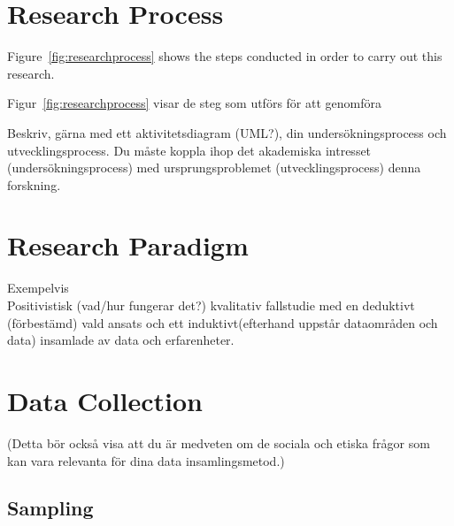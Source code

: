 \section{Research Process}
\label{sec:researchProcess}
Figure~\ref{fig:researchprocess} shows the steps conducted in order to carry out this research.
\begin{swedishnotes}
	Figur~\ref{fig:researchprocess} visar de steg som utförs för att genomföra

	Beskriv, gärna med ett aktivitetsdiagram (UML?), din undersökningsprocess och utvecklingsprocess.  Du måste koppla ihop det akademiska intresset (undersökningsprocess) med ursprungsproblemet (utvecklingsprocess)
	denna forskning.
\end{swedishnotes}



\section{Research Paradigm}
\label{sec:researchParadigm}
\begin{swedishnotes}
	Exempelvis\\
	Positivistisk (vad/hur fungerar det?) kvalitativ fallstudie med en deduktivt (förbestämd) vald ansats och ett induktivt(efterhand uppstår dataområden och data) insamlade av data och erfarenheter.
\end{swedishnotes}

\section{Data Collection}
\label{sec:dataCollection}
\begin{swedishnotes}
	(Detta bör också visa att du är medveten om de sociala och etiska frågor som
	kan vara relevanta för dina data insamlingsmetod.)
\end{swedishnotes}

\subsection{Sampling}

